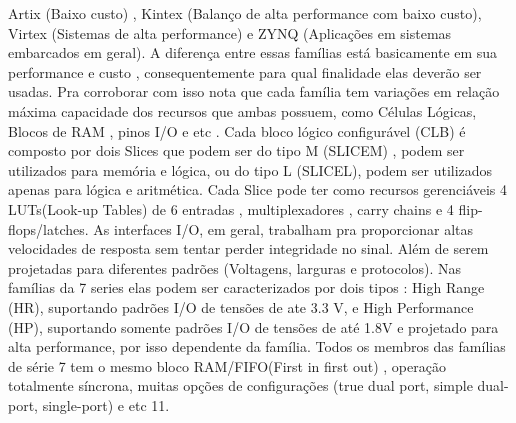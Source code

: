 Artix (Baixo custo) , Kintex (Balanço de alta performance com baixo custo), Virtex (Sistemas de alta performance) e ZYNQ (Aplicações em sistemas embarcados em geral).
A diferença entre essas famílias está basicamente em sua performance e custo , consequentemente para qual finalidade elas deverão ser usadas. Pra corroborar com isso nota que cada família tem variações em relação máxima capacidade dos recursos que ambas possuem, como Células Lógicas, Blocos de RAM , pinos I/O e etc .
Cada bloco lógico configurável (CLB) é composto por dois Slices que podem ser do tipo M (SLICEM) , podem ser utilizados para memória e lógica, ou do tipo L (SLICEL), podem ser utilizados apenas para lógica e aritmética. 
Cada Slice pode ter como recursos gerenciáveis 4 LUTs(Look-up Tables) de 6 entradas , multiplexadores , carry chains e 4 flip-flops/latches.
As interfaces I/O, em geral, trabalham pra proporcionar altas velocidades de resposta sem tentar perder integridade no sinal. Além de serem projetadas para diferentes padrões (Voltagens, larguras e protocolos). Nas famílias da 7 series elas podem ser caracterizados por dois tipos : High Range (HR), suportando padrões I/O de tensões de ate 3.3 V,  e High Performance (HP), suportando somente padrões I/O de tensões de até 1.8V e projetado para alta performance, por isso dependente da família.
Todos os membros das famílias de série 7 tem o mesmo bloco RAM/FIFO(First in first out) , operação totalmente síncrona, muitas opções de configurações (true dual port, simple dual-port, single-port) e etc {11}. 




